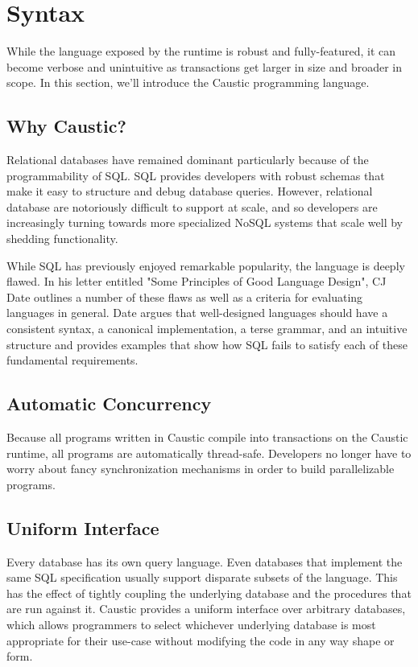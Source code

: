 \documentclass[12pt]{article}
\begin{document}
\section{Syntax}
  While the language exposed by the runtime is robust and fully-featured, it can become verbose and
  unintuitive as transactions get larger in size and broader in scope. In this section, we'll
  introduce the Caustic programming language.

  \subsection{Why Caustic?}
    Relational databases have remained dominant particularly because of the programmability of SQL.
    SQL provides developers with robust schemas that make it easy to structure and debug database
    queries. However, relational database are notoriously difficult to support at scale, and so
    developers are increasingly turning towards more specialized NoSQL systems that scale well by
    shedding functionality.

    While SQL has previously enjoyed remarkable popularity, the language is deeply flawed. In his
    letter entitled "Some Principles of Good Language Design", CJ Date outlines a number of these
    flaws as well as a criteria for evaluating languages in general. Date argues that well-designed
    languages should have a consistent syntax, a canonical implementation, a terse grammar, and an
    intuitive structure and provides examples that show how SQL fails to satisfy each of these
    fundamental requirements.

  \subsection{Automatic Concurrency}
    Because all programs written in Caustic compile into transactions on the Caustic runtime, all
    programs are automatically thread-safe. Developers no longer have to worry about fancy
    synchronization mechanisms in order to build parallelizable programs.

  \subsection{Uniform Interface}
    Every database has its own query language. Even databases that implement the same SQL
    specification usually support disparate subsets of the language. This has the effect of tightly
    coupling the underlying database and the procedures that are run against it. Caustic provides
    a uniform interface over arbitrary databases, which allows programmers to select whichever
    underlying database is most appropriate for their use-case without modifying the code in any
    way shape or form.
\end{document}
